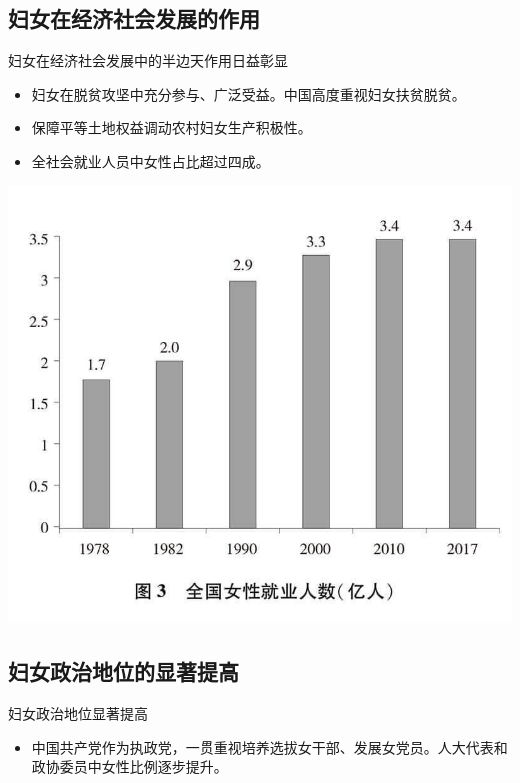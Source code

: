 \subsection{妇女在经济社会发展的作用}
\begin{frame}{妇女在经济社会发展中的半边天作用日益彰显}
    \begin{block}{}
        \begin{itemize}
            \item 妇女在脱贫攻坚中充分参与、广泛受益。中国高度重视妇女扶贫脱贫。
            \item 保障平等土地权益调动农村妇女生产积极性。
            \item 全社会就业人员中女性占比超过四成。
        \end{itemize}
    \end{block}
    \begin{center}
        \includegraphics[width=.45\textwidth]{../docs/img/2-4.jpg}
    \end{center}
\end{frame}



\subsection{妇女政治地位的显著提高}
\begin{frame}{妇女政治地位显著提高}
    \begin{block}{}
        \begin{itemize}
            \item 中国共产党作为执政党，一贯重视培养选拔女干部、发展女党员。人大代表和政协委员中女性比例逐步提升。
        \end{itemize}
    \end{block}
\end{frame}



